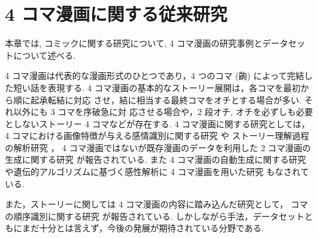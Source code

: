 \newpage
\changeindent{0cm}
\section{4 コマ漫画に関する従来研究}
\changeindent{2cm}

本章では, コミックに関する研究について, 4 コマ漫画の研究事例とデータセットについて述べる.

4 コマ漫画は代表的な漫画形式のひとつであり，4 つのコマ (齣) によって完結した短い話を表現する.
4 コマ漫画の基本的なストーリー展開は，各コマを最初から順に起承転結に対応
させ，結に相当する最終コマをオチとする場合が多い. それ以外にも 3 コマを序破急に対
応させる場合や，2 段オチ, オチを必ずしも必要としないストーリー 4 コマなどが存在する.
4 コマ漫画に関する研究としては，
4 コマにおける画像特徴が与える感情識別に関する研究 \cite{ueno-emotion2016} や
ストーリー理解過程の解析研究 \cite{ueno-oti2017}，
4 コマ漫画ではないが既存漫画のデータを利用した
2 コマ漫画の生成に関する研究 \cite{jsai18mukaeyama} が報告されている.
また 4 コマ漫画の自動生成に関する研究 \cite{ueno:dcai2016}
や遺伝的アルゴリズムに基づく感性解析に
4 コマ漫画を用いた研究 \cite{GA4koma} もなされている.

また，ストーリーに関しては 4 コマ漫画の内容に踏み込んだ研究として，
コマの順序識別に関する研究 \cite{ueno2016estimation,jsai18fujino} が報告されている.
しかしながら手法，データセットともにまだ十分とは言えず，今後の発展が期待されている分野である.
